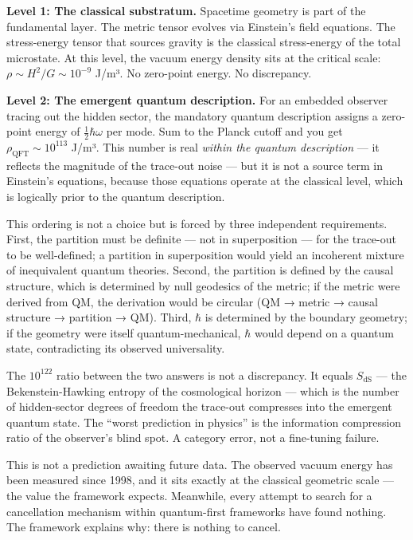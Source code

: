 \documentclass[
]{article}
\begin{document}
\textbf{Level 1: The classical substratum.} Spacetime geometry is part
of the fundamental layer. The metric tensor evolves via Einstein's field
equations. The stress-energy tensor that sources gravity is the
classical stress-energy of the total microstate. At this level, the
vacuum energy density sits at the critical scale:
\(\rho \sim H^2/G \sim 10^{-9}\) J/m³. No zero-point energy. No
discrepancy.

\textbf{Level 2: The emergent quantum description.} For an embedded
observer tracing out the hidden sector, the mandatory quantum
description assigns a zero-point energy of \(\frac{1}{2}\hbar\omega\)
per mode. Sum to the Planck cutoff and you get
\(\rho_{\text{QFT}} \sim 10^{113}\) J/m³. This number is real
\emph{within the quantum description} --- it reflects the magnitude of
the trace-out noise --- but it is not a source term in Einstein's
equations, because those equations operate at the classical level, which
is logically prior to the quantum description.

This ordering is not a choice but is forced by three independent
requirements. First, the partition must be definite --- not in
superposition --- for the trace-out to be well-defined; a partition in
superposition would yield an incoherent mixture of inequivalent quantum
theories. Second, the partition is defined by the causal structure,
which is determined by null geodesics of the metric; if the metric were
derived from QM, the derivation would be circular (QM → metric → causal
structure → partition → QM). Third, \(\hbar\) is determined by the
boundary geometry; if the geometry were itself quantum-mechanical,
\(\hbar\) would depend on a quantum state, contradicting its observed
universality.

The \(10^{122}\) ratio between the two answers is not a discrepancy. It
equals \(S_{\text{dS}}\) --- the Bekenstein-Hawking entropy of the
cosmological horizon --- which is the number of hidden-sector degrees of
freedom the trace-out compresses into the emergent quantum state. The
``worst prediction in physics'' is the information compression ratio of
the observer's blind spot. A category error, not a fine-tuning failure.

This is not a prediction awaiting future data. The observed vacuum
energy has been measured since 1998, and it sits exactly at the
classical geometric scale --- the value the framework expects.
Meanwhile, every attempt to search for a cancellation mechanism within
quantum-first frameworks have found nothing. The framework explains why:
there is nothing to cancel.
\end{document}
